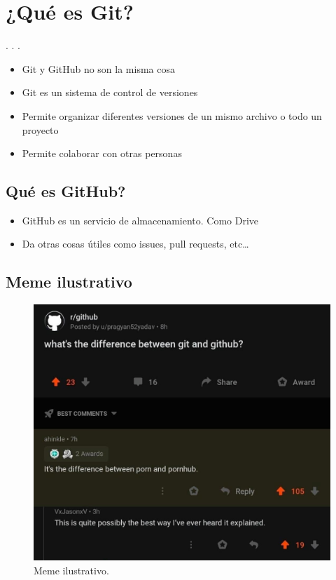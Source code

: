 \section{¿Qué es Git?}

. . .

\begin{itemize}
\item
  Git y GitHub no son la misma cosa
\item
  Git es un sistema de control de versiones
\item
  Permite organizar diferentes versiones de un mismo archivo o todo un
  proyecto
\item
  Permite colaborar con otras personas
\end{itemize}

\subsection{Qué es GitHub?}

\begin{itemize}
\item
  GitHub es un servicio de almacenamiento. Como Drive
\item
  Da otras cosas útiles como issues, pull requests, etc\ldots{}
\end{itemize}

\subsection{Meme ilustrativo}

\begin{figure}
\centering
\includegraphics{figs/meme_git_v_gh.jpg}
\caption{Meme ilustrativo.}
\end{figure}

